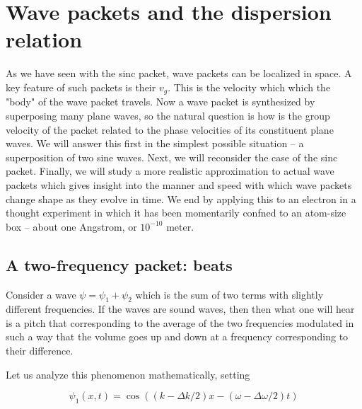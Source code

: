 
\setcounter{section}{2}

\section{Wave packets and the dispersion relation}




As we have seen with the sinc packet, wave packets can be localized in space.  A key feature of such packets is their  $v_g$.  This is the velocity which which the "body" of the wave packet travels.  Now a wave packet is synthesized by superposing many plane waves, so the natural question is how is the group velocity of the packet related to the phase velocities of its constituent plane waves.  We will answer this first in the simplest possible situation -- a superposition of two sine waves.  Next, we will reconsider the case of the sinc packet.  Finally, we will study a more realistic approximation to actual wave packets which gives insight into the manner and speed with which wave packets change shape as they evolve in time.  We end by applying this to an electron in a thought experiment in which it has been momentarily confned to an atom-size box -- about one Angstrom, or $10^{-10}\text{ meter}$.



\subsection{A two-frequency packet: beats}

Consider a wave
$\psi = \psi_1 + \psi_2$ which is the sum of two terms with slightly different frequencies.  If the waves are sound waves, then then what one will hear is a pitch that corresponding to the average of the two frequencies modulated in such a way that the volume goes up and down at a frequency corresponding to their difference.

Let us analyze this phenomenon mathematically, setting



\begin{equation}
\psi_1(x,t)  = \cos((k - \Delta k/2)x - (\omega - \Delta \omega/2)t)
\end{equation}

